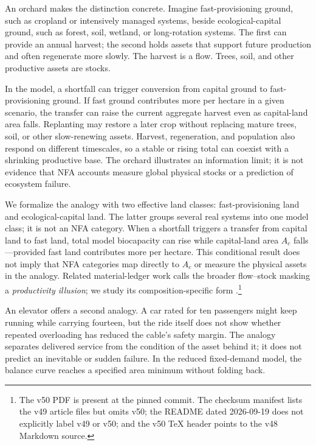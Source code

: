 \documentclass[preprint,12pt,authoryear]{elsarticle}
\begin{document}
An orchard makes the distinction concrete. Imagine fast-provisioning ground, such as cropland or intensively managed systems, beside ecological-capital ground, such as forest, soil, wetland, or long-rotation systems. The first can provide an annual harvest; the second holds assets that support future production and often regenerate more slowly. The harvest is a flow. Trees, soil, and other productive assets are stocks.

In the model, a shortfall can trigger conversion from capital ground to fast-provisioning ground. If fast ground contributes more per hectare in a given scenario, the transfer can raise the current aggregate harvest even as capital-land area falls. Replanting may restore a later crop without replacing mature trees, soil, or other slow-renewing assets. Harvest, regeneration, and population also respond on different timescales, so a stable or rising total can coexist with a shrinking productive base. The orchard illustrates an information limit; it is not evidence that NFA accounts measure global physical stocks or a prediction of ecosystem failure.

We formalize the analogy with two effective land classes: fast-provisioning land and ecological-capital land. The latter groups several real systems into one model class; it is not an NFA category. When a shortfall triggers a transfer from capital land to fast land, total model biocapacity can rise while capital-land area $A_c$ falls—provided fast land contributes more per hectare. This conditional result does not imply that NFA categories map directly to $A_c$ or measure the physical assets in the analogy. Related material-ledger work calls the broader flow--stock masking a \emph{productivity illusion}; we study its composition-specific form \citep{Abaee2026c}.\footnote{The v50 PDF is present at the pinned commit. The checksum manifest lists the v49 article files but omits v50; the README dated 2026-09-19 does not explicitly label v49 or v50; and the v50 TeX header points to the v48 Markdown source.}

An elevator offers a second analogy. A car rated for ten passengers might keep running while carrying fourteen, but the ride itself does not show whether repeated overloading has reduced the cable's safety margin. The analogy separates delivered service from the condition of the asset behind it; it does not predict an inevitable or sudden failure. In the reduced fixed-demand model, the balance curve reaches a specified area minimum without folding back.
\end{document}
